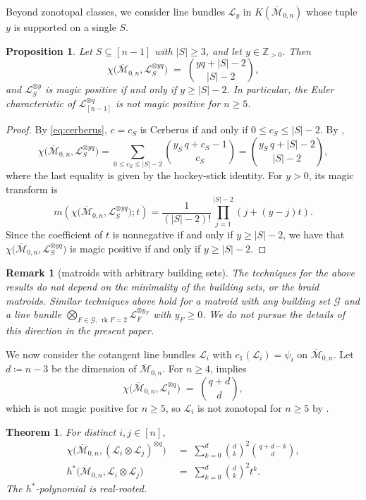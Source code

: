 \documentclass[11pt,a4paper,reqno]{amsart}
\theoremstyle{results}
\newtheorem{proposition}[thm]{Proposition}
\theoremstyle{definitions}
\newtheorem{remark}[thm]{Remark}
\def\Z{\mathbb{Z}}
\def\Z{\mathbb{Z}}
\newcommand{\abs}[1]{\left\lvert#1\right\rvert}
\newcommand{\G}{\textrm{G}}
\newcommand{\rk}{\operatorname{rk}}
\renewcommand{\G}{\mathcal{G}}
\newtheorem{theorem}[thm]{Theorem}
\newcommand{\hstar}{h^{*}}
\newcommand{\cL}{\mathcal{L}}
\newcommand{\Mbar}{\overline{\mathcal M}}
\begin{document}
Beyond zonotopal classes, we consider line bundles $\cL_y$ in $K(\Mbar_{0, n})$ whose tuple $y$ is supported on a single $S$. 
\begin{proposition}\label{prop:m0n-single}
  Let $S \subseteq [n-1]$ with $|S| \geqslant 3$, and let $y\in\Z_{>0}$. Then
  \[
    \chi\big(\Mbar_{0,n}, \cL_S^{\otimes yq}\big)
    \;=\; \binom{yq + |S| - 2}{|S| - 2} ,
  \]
  and $\cL_S^{\otimes y}$ is magic positive if and only if $y \geqslant |S| - 2$.
  In particular, the Euler characteristic of $\cL_{[n-1]}^{\otimes q}$ is not magic
  positive for $n \geqslant 5$.
\end{proposition}


\begin{proof}
  By \eqref{eq:cerberus}, $c = c_S$ is Cerberus if and only if $0 \leqslant c_S \leqslant \abs{S} - 2$.  
  By ,
  \[
  \chi\big(\Mbar_{0,n},\cL_S^{\otimes yq}\big) = \sum_{0 \leqslant c_S \leqslant \abs{S} - 2} \binom{y_S \, q + c_S - 1}{c_S} = \binom{y_S \,q + \abs{S} -2}{\abs{S} -2}, 
  \] 
  where the last equality is given by the hockey-stick identity. 
  For $y>0$, its magic transform is
  \[
  m(\chi\big(\Mbar_{0,n},\cL_S^{\otimes yq}\big); t) = \frac1{(|S|-2)!}\prod_{j=1}^{|S|-2}(j+(y-j)t).
  \] 
  Since the coefficient of $t$ is nonnegative if and only if $y \geqslant \abs{S} - 2$, we have that 
  $\chi\big(\Mbar_{0,n},\cL_S^{\otimes yq}\big)$ is magic positive if and only if $y \geqslant \abs{S} - 2$. 
\end{proof}

\begin{remark}[matroids with arbitrary building sets]\label{rem:building-sets}
  The techniques for the above results do not depend on the minimality of the building sets, or the braid matroids. Similar techniques above hold for a matroid with any building set
  $\G$ and a line bundle $\bigotimes_{F\in\G,\,\rk F=2}\cL_F^{\otimes y_F}$
  with $y_F\geqslant0$. We do not pursue the details of this direction in the present paper. 
\end{remark}

We now consider the cotangent line bundles $\cL_i$ with $c_1(\cL_i) = \psi_i$ on $\Mbar_{0, n}$.
Let $d \coloneqq n - 3$ be the dimension of
$\Mbar_{0,n}$.  For $n \geqslant 4$,  implies
\[
  \chi\big(\Mbar_{0,n}, \cL_i^{\otimes q}\big) \;=\; \binom{q+d}{d},
\]
which is not magic positive for $n \geqslant 5$, so $\cL_i$ is not zonotopal for
$n \geqslant 5$ by .

\begin{theorem}\label{thm:psi-two}
  For distinct $i, j \in [n]$,
  \begin{align*}
    \chi\big(\Mbar_{0,n}, (\cL_i \otimes \cL_j)^{\otimes q}\big)
    &\;=\; \sum_{k=0}^{d} \binom{d}{k}^{2} \binom{q + d - k}{d}, \\
    \hstar\big(\Mbar_{0,n}, \cL_i \otimes \cL_j\big)
    &\;=\; \sum_{k=0}^{d} \binom{d}{k}^{2} t^{k} .
  \end{align*}
  The $\hstar$-polynomial is real-rooted.
\end{theorem}
\end{document}
